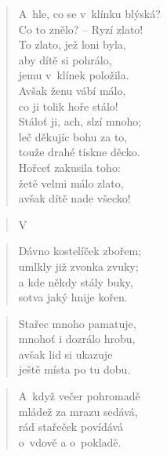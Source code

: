 \begin{verse}
A~hle, co se v~klínku blýská? \\
Co to znělo? -- Ryzí zlato! \\
To zlato, jež loni byla, \\
aby dítě si pohrálo, \\
jemu v~klínek položila. \\
Avšak ženu vábí málo, \\
co ji tolik hoře stálo! \\
Stáloť ji, ach, slzí mnoho; \\
leč děkujíc bohu za to, \\
touže drahé tiskne děcko. \\
Hořceť zakusila toho: \\
žetě velmi málo zlato, \\
avšak dítě nade všecko!
\end{verse}

\begin{verse}
V~\end{verse}

\begin{verse}
Dávno kostelíček zbořem; \\
umlkly již zvonka zvuky; \\
a kde někdy stály buky, \\
sotva jaký hnije kořen.
\end{verse}

\begin{verse}
Stařec mnoho pamatuje, \\
mnohoť i dozrálo hrobu, \\
avšak lid si ukazuje \\
ještě místa po tu dobu.
\end{verse}

\begin{verse}
A~když večer pohromadě \\
mládež za mrazu sedává, \\
rád stařeček povídává \\
o~vdově a o~pokladě.
\end{verse}